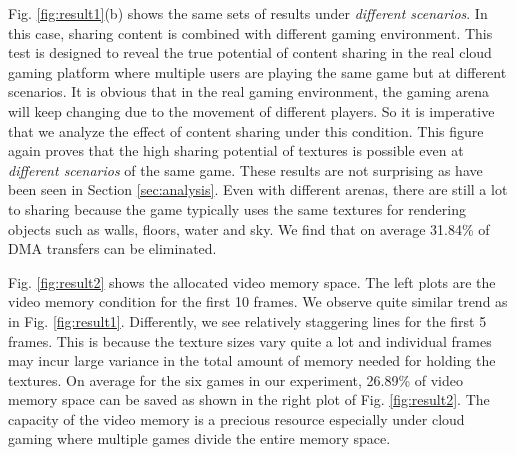 \documentclass[pageno]{jpaper}
\begin{document}
Fig. \ref{fig:result1}(b) shows the same sets of results under \emph{different scenarios}. In this case, sharing content is combined with different gaming environment. This test is designed to reveal the true potential of content sharing in the real cloud gaming platform where multiple users are playing the same game but at different scenarios. It is obvious that in the real gaming environment, the gaming arena will keep changing due to the movement of different players. So it is imperative that we analyze the effect of content sharing under this condition. This figure again proves that the high sharing potential of textures is possible even at \emph{different scenarios} of the same game. These results are not surprising as have been seen in Section \ref{sec:analysis}. Even with different arenas, there are still a lot to sharing because the game typically uses the same textures for rendering objects such as walls, floors, water and sky. We find that on average 31.84\% of DMA transfers can be eliminated.


Fig. \ref{fig:result2} shows the allocated video memory space. The left plots are the video memory condition for the first 10 frames. We observe quite similar trend as in Fig. \ref{fig:result1}. Differently, we see relatively staggering lines for the first 5 frames. This is because the texture sizes vary quite a lot and individual frames may incur large variance in the total amount of memory needed for holding the textures. On average for the six games in our experiment, 26.89\% of video memory space can be saved as shown in the right plot of Fig. \ref{fig:result2}. The capacity of the video memory is a precious resource especially under cloud gaming where multiple games divide the entire memory space.
\end{document}
